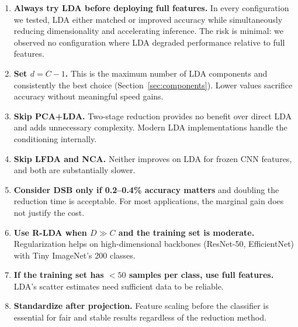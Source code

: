 \begin{enumerate}[leftmargin=*]
    \item \textbf{Always try LDA before deploying full features.} In every configuration we tested, LDA either matched or improved accuracy while simultaneously reducing dimensionality and accelerating inference. The risk is minimal: we observed no configuration where LDA degraded performance relative to full features.

    \item \textbf{Set $d = C - 1$.} This is the maximum number of LDA components and consistently the best choice (Section~\ref{sec:components}). Lower values sacrifice accuracy without meaningful speed gains.

    \item \textbf{Skip PCA+LDA.} Two-stage reduction provides no benefit over direct LDA and adds unnecessary complexity. Modern LDA implementations handle the conditioning internally.

    \item \textbf{Skip LFDA and NCA.} Neither improves on LDA for frozen CNN features, and both are substantially slower.

    \item \textbf{Consider DSB only if 0.2--0.4\% accuracy matters} and doubling the reduction time is acceptable. For most applications, the marginal gain does not justify the cost.

    \item \textbf{Use R-LDA when $D \gg C$ and the training set is moderate.} Regularization helps on high-dimensional backbones (ResNet-50, EfficientNet) with Tiny ImageNet's 200 classes.

    \item \textbf{If the training set has $< 50$ samples per class, use full features.} LDA's scatter estimates need sufficient data to be reliable.

    \item \textbf{Standardize after projection.} Feature scaling before the classifier is essential for fair and stable results regardless of the reduction method.
\end{enumerate}
